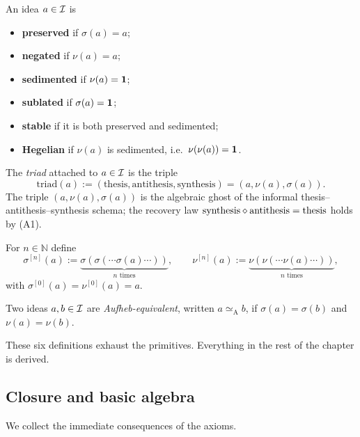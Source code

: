 \begin{definition}\label{def:aufheb-preds}
An idea $a\in\mathcal{I}$ is
\begin{itemize}
\item \textbf{preserved} if $\sigma(a)=a$;
\item \textbf{negated} if $\nu(a)=a$;
\item \textbf{sedimented} if $\nu(a)=\mathbf{1}$;
\item \textbf{sublated} if $\sigma(a)=\mathbf{1}$;
\item \textbf{stable} if it is both preserved and sedimented;
\item \textbf{Hegelian} if $\nu(a)$ is sedimented, i.e.\
$\nu(\nu(a))=\mathbf{1}$.
\end{itemize}
\end{definition}

\begin{definition}[Triad]\label{def:triad}
The \emph{triad} attached to $a\in\mathcal{I}$ is the triple
\[
\mathrm{triad}(a):=(\mathrm{thesis},\mathrm{antithesis},\mathrm{synthesis})=(a,\nu(a),\sigma(a)).
\]
The triple $(a,\nu(a),\sigma(a))$ is the algebraic ghost of the
informal thesis--antithesis--synthesis schema; the recovery law
$\mathrm{synthesis}\mathbin{\diamond}\mathrm{antithesis}=\mathrm{thesis}$ holds by (A1).
\end{definition}

\begin{definition}\label{def:iterates}
For $n\in\mathbb{N}$ define
\[
\sigma^{[n]}(a):=\underbrace{\sigma(\sigma(\cdots\sigma(a)\cdots))}_{n\text{ times}},
\qquad
\nu^{[n]}(a):=\underbrace{\nu(\nu(\cdots\nu(a)\cdots))}_{n\text{ times}},
\]
with $\sigma^{[0]}(a)=\nu^{[0]}(a)=a$.
\end{definition}

\begin{definition}\label{def:aufheb-equiv}
Two ideas $a,b\in\mathcal{I}$ are \emph{Aufheb-equivalent}, written
$a\simeq_{\text{A}} b$, if $\sigma(a)=\sigma(b)$ and
$\nu(a)=\nu(b)$.
\end{definition}

These six definitions exhaust the primitives. Everything in the rest
of the chapter is derived.

\subsection*{Closure and basic algebra}

We collect the immediate consequences of the axioms.

